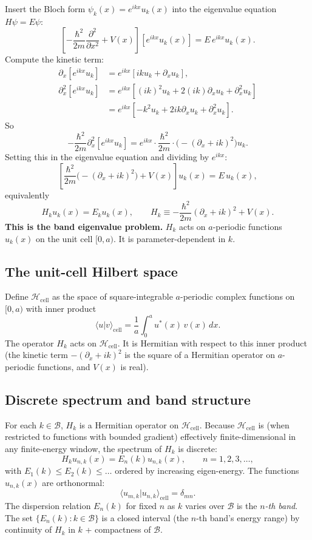 \documentclass[11pt,a4paper]{article}
\begin{document}
Insert the Bloch form $\psi_k(x) = e^{ikx} u_k(x)$ into the eigenvalue equation $H\psi = E\psi$:
\[
\left[-\frac{\hbar^{2}}{2m} \frac{\partial^{2}}{\partial x^{2}} + V(x)\right] [e^{ikx} u_k(x)] = E\, e^{ikx} u_k(x).
\]
Compute the kinetic term:
\begin{align*}
\partial_x [e^{ikx} u_k] &= e^{ikx} [ik u_k + \partial_x u_k], \\
\partial^{2}_x [e^{ikx} u_k] &= e^{ikx} [(ik)^{2} u_k + 2(ik) \partial_x u_k + \partial^{2}_x u_k] \\
&= e^{ikx} [-k^{2} u_k + 2ik \partial_x u_k + \partial^{2}_x u_k].
\end{align*}
So
\[
-\frac{\hbar^{2}}{2m} \partial^{2}_x [e^{ikx} u_k] = e^{ikx} \cdot \frac{\hbar^{2}}{2m} \cdot \bigl(-(\partial_x + ik)^{2}\bigr) u_k.
\]
Setting this in the eigenvalue equation and dividing by $e^{ikx}$:
\[
\left[\frac{\hbar^{2}}{2m} \bigl(-(\partial_x + ik)^{2}\bigr) + V(x)\right] u_k(x) = E\, u_k(x),
\]
equivalently
\[
H_k u_k(x) = E_k u_k(x), \qquad H_k \equiv -\frac{\hbar^{2}}{2m} (\partial_x + ik)^{2} + V(x).
\]
\textbf{This is the band eigenvalue problem.} $H_k$ acts on $a$-periodic functions $u_k(x)$ on the unit cell $[0, a)$. It is parameter-dependent in $k$.

\subsection{The unit-cell Hilbert space}

Define $\mathcal{H}_{\mathrm{cell}}$ as the space of square-integrable $a$-periodic complex functions on $[0, a)$ with inner product
\[
\langle u | v\rangle_{\mathrm{cell}} = \frac{1}{a} \int_0^a u^*(x)\, v(x)\, dx.
\]
The operator $H_k$ acts on $\mathcal{H}_{\mathrm{cell}}$. It is Hermitian with respect to this inner product (the kinetic term $-(\partial_x + ik)^2$ is the square of a Hermitian operator on $a$-periodic functions, and $V(x)$ is real).

\subsection{Discrete spectrum and band structure}

For each $k \in \mathcal{B}$, $H_k$ is a Hermitian operator on $\mathcal{H}_{\mathrm{cell}}$. Because $\mathcal{H}_{\mathrm{cell}}$ is (when restricted to functions with bounded gradient) effectively finite-dimensional in any finite-energy window, the spectrum of $H_k$ is discrete:
\[
H_k u_{n,k}(x) = E_n(k) u_{n,k}(x), \qquad n = 1, 2, 3, \ldots,
\]
with $E_1(k) \leq E_2(k) \leq \ldots$ ordered by increasing eigen-energy. The functions $u_{n,k}(x)$ are orthonormal:
\[
\langle u_{m,k} | u_{n,k}\rangle_{\mathrm{cell}} = \delta_{mn}.
\]
The dispersion relation $E_n(k)$ for fixed $n$ as $k$ varies over $\mathcal{B}$ is the \emph{$n$-th band}. The set $\{E_n(k) : k \in \mathcal{B}\}$ is a closed interval (the $n$-th band's energy range) by continuity of $H_k$ in $k$ + compactness of $\mathcal{B}$.
\end{document}
